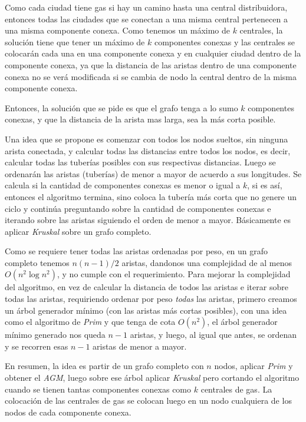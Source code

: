 Como cada ciudad tiene gas si hay un camino hasta una central distribuidora, entonces todas las ciudades que se conectan
a una misma central pertenecen a una misma componente conexa. Como tenemos un m\'aximo de $k$ centrales, la soluci\'on tiene que tener un m\'aximo de $k$ componentes conexas y las centrales se colocar\'an cada una en una componente conexa y en cualquier ciudad dentro de la componente conexa, ya que la distancia de las aristas dentro de una componente conexa no se ver\'a modificada si se cambia de nodo la central dentro de la misma componente conexa.

Entonces, la soluci\'on que se pide es que el grafo tenga a lo sumo $k$ componentes conexas, y que la distancia de la arista mas larga, sea la m\'as corta posible.

Una idea que se propone es comenzar con todos los nodos sueltos, sin ninguna arista conectada,
y calcular todas las distancias entre todos los nodos, es decir, calcular todas las tuber\'ias posibles con sus respectivas distancias.
Luego se ordenar\'an las aristas (tuber\'ias) de menor a mayor de acuerdo a sus longitudes.
Se calcula si la cantidad de componentes conexas es menor o igual a $k$, si es as\'i, entonces el algoritmo termina, sino coloca la tuber\'ia m\'as corta que no genere un ciclo y contin\'ua preguntando sobre la cantidad de componentes conexas e iterando sobre las aristas siguiendo el orden de menor a mayor.
B\'asicamente es aplicar \emph{Kruskal} sobre un grafo completo.

Como se requiere tener todas las aristas ordenadas por peso, en un grafo completo tenemos $n(n-1)/2$ aristas, dandonos una complejidad de al menos $O(n^2 \log n^2)$, y no cumple con el requerimiento.
Para mejorar la complejidad del algoritmo, en vez de calcular la distancia de todos las aristas e iterar sobre todas las aristas, requiriendo ordenar por peso \emph{todas} las aristas, primero creamos un \'arbol generador m\'inimo (con las aristas m\'as cortas posibles), con una idea como el algoritmo de \emph{Prim} y que tenga de cota $O(n^2)$,
el \'arbol generador m\'inimo generado nos queda $n - 1$ aristas, y luego, al igual que antes, se ordenan y se recorren esas $n - 1$ aristas de menor a mayor.

En resumen, la idea es partir de un grafo completo con $n$ nodos, aplicar \emph{Prim} y obtener el \emph{AGM}, luego sobre ese \'arbol aplicar \emph{Kruskal} pero cortando el algoritmo cuando se tienen tantas componentes conexas como $k$ centrales de gas. La colocaci\'on de las centrales de gas se colocan luego en un nodo cualquiera de los nodos de cada componente conexa.

